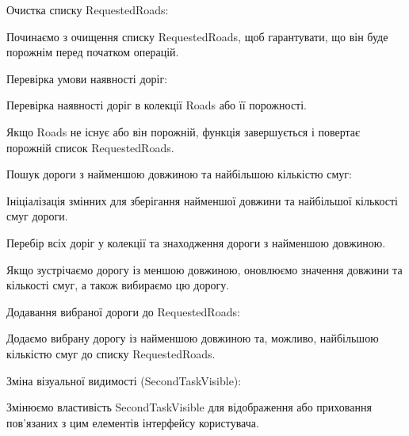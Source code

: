 \documentclass[14pt]{extarticle}
\begin{document}

\begin{secondList}
\item Очистка списку RequestedRoads:
\begin{secondList}
    
\item Починаємо з очищення списку RequestedRoads, щоб гарантувати, що він буде порожнім перед початком операцій.
\end{secondList}

\item Перевірка умови наявності доріг:
\begin{secondList}
    
\item Перевірка наявності доріг в колекції Roads або її порожності.
\item Якщо Roads не існує або він порожній, функція завершується і повертає порожній список RequestedRoads.
\end{secondList}

\item Пошук дороги з найменшою довжиною та найбільшою кількістю смуг:
\begin{secondList}
\item Ініціалізація змінних для зберігання найменшої довжини та найбільшої кількості смуг дороги.
\item Перебір всіх доріг у колекції та знаходження дороги з найменшою довжиною.
\item Якщо зустрічаємо дорогу із меншою довжиною, оновлюємо значення довжини та кількості смуг, а також вибираємо цю дорогу.
\end{secondList}

\item Додавання вибраної дороги до RequestedRoads:
\begin{secondList}
\item Додаємо вибрану дорогу із найменшою довжиною та, можливо, найбільшою кількістю смуг до списку RequestedRoads.
\end{secondList}

\item Зміна візуальної видимості (SecondTaskVisible):
\begin{secondList}
\item Змінюємо властивість SecondTaskVisible для відображення або приховання пов'язаних з цим елементів інтерфейсу користувача. 
\end{secondList}
\end{secondList}
\end{document}
